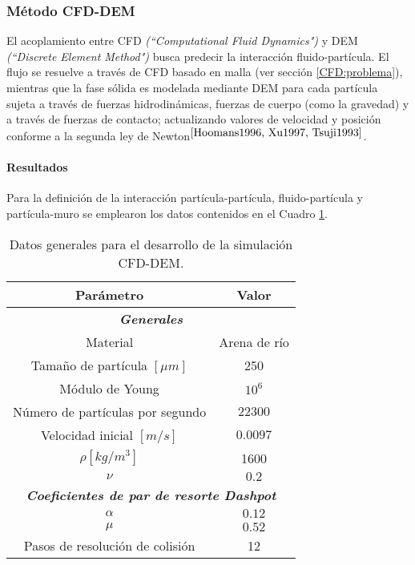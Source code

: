 \subsubsection{M\'etodo CFD-DEM}

\noindent
\justify

El acoplamiento entre CFD \textit{(``Computational Fluid Dynamics")} y DEM \textit{(``Discrete Element Method")} busca predecir la interacci\'on fluido-part\'icula. El flujo se resuelve a trav\'es de CFD basado en malla (ver secci\'on \ref{CFD:problema}), mientras que la fase s\'olida es modelada mediante DEM para cada part\'icula sujeta a trav\'es de fuerzas hidrodin\'amicas, fuerzas de cuerpo (como la gravedad) y a trav\'es de fuerzas de contacto; actualizando valores de velocidad y posici\'on conforme a la segunda ley de Newton$^{\cite{Hoomans1996, Xu1997, Tsuji1993}}$. 

\noindent
\justify



\paragraph{Resultados} \label{CFDEM:resultados}

\noindent
\justify

Para la definici\'on de la interacci\'on part\'icula-part\'icula, fluido-part\'icula y part\'icula-muro se emplearon los datos contenidos en el Cuadro \ref{CFDEMdata}.

\begin{table}[h!]
	\centering
	\begin{adjustbox}{max width = 0.45\textwidth}
	\begin{tabular}{|c|c|}
		\hline
		\textbf{Par\'ametro} & \textbf{Valor} \\ \hline
		\multicolumn{2}{|c|}{\textbf{\textit{Generales}}} \\ \hline
		Material & Arena de r\'io \\ \hline
		Tama\~no de part\'icula $[\mu m]$ & 250 \\ \hline
		M\'odulo de Young & $10 ^6$ \\ \hline
		 N\'umero de part\'iculas por segundo & $22300$ \\
		  \hline
		 Velocidad inicial $[m / s]$ & $0.0097$ \\ \hline
		 $\rho [kg/m^3]$ & 1600 \\ \hline
		 $\nu$ & $0.2$ \\ \hline
		 \multicolumn{2}{|c|}{\textbf{\textit{Coeficientes de par de resorte Dashpot}}} \\ \hline
		 $\alpha$ & $0.12$ \\ \hline
		 $\mu$ & $0.52$ \\ \hline
		 Pasos de resoluci\'on de colisi\'on & 12 \\ \hline
	\end{tabular}
	\end{adjustbox}
	\caption{Datos generales para el desarrollo de la simulaci\'on CFD-DEM.}
	\label{CFDEMdata}
\end{table}

